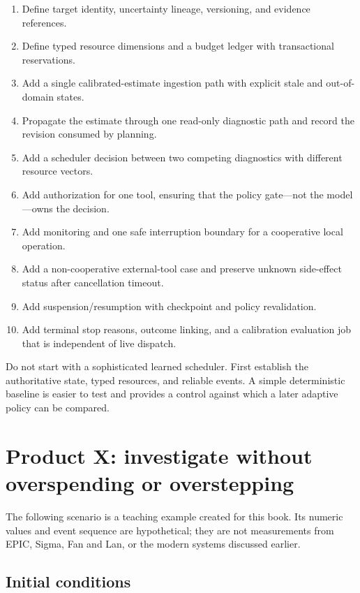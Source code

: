 \begin{enumerate}
  \item Define target identity, uncertainty lineage, versioning, and evidence references.
  \item Define typed resource dimensions and a budget ledger with transactional reservations.
  \item Add a single calibrated-estimate ingestion path with explicit stale and out-of-domain states.
  \item Propagate the estimate through one read-only diagnostic path and record the revision consumed by planning.
  \item Add a scheduler decision between two competing diagnostics with different resource vectors.
  \item Add authorization for one tool, ensuring that the policy gate—not the model—owns the decision.
  \item Add monitoring and one safe interruption boundary for a cooperative local operation.
  \item Add a non-cooperative external-tool case and preserve unknown side-effect status after cancellation timeout.
  \item Add suspension/resumption with checkpoint and policy revalidation.
  \item Add terminal stop reasons, outcome linking, and a calibration evaluation job that is independent of live dispatch.
\end{enumerate}

Do not start with a sophisticated learned scheduler. First establish the authoritative state, typed resources, and reliable events. A simple deterministic baseline is easier to test and provides a control against which a later adaptive policy can be compared.

\section{Product X: investigate without overspending or overstepping}
\label{sec:ch16-productx}

\BookExampleLabel{} The following scenario is a teaching example created for this book. Its numeric values and event sequence are hypothetical; they are not measurements from EPIC, Sigma, Fan and Lan, or the modern systems discussed earlier.

\subsection{Initial conditions}

